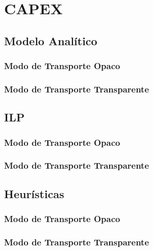 \chapter{CAPEX}
\label{chapter3}

\section{Modelo Analítico}
   
\subsection{Modo de Transporte Opaco}   

\subsection{Modo de Transporte Transparente}

\section{ILP}

\subsection{Modo de Transporte Opaco}   

\subsection{Modo de Transporte Transparente}

\section{Heurísticas}

\subsection{Modo de Transporte Opaco}   

\subsection{Modo de Transporte Transparente}

\cleardoublepage